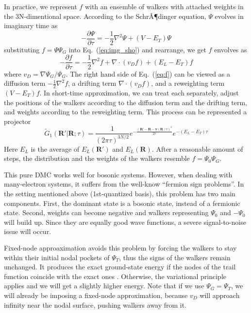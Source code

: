 \documentclass[aps,prl,reprint,groupedaddress]{revtex4-1}
\begin{document}
In practice, we represent $f$ with an ensemble of walkers with attached weights in the 3N-dimentional space.
According to the SchrÃ¶dinger equation, $\Psi$ evolves in imaginary time as
\begin{equation}
\label{eq:img_sho}
-\frac{\partial \Psi}{\partial \tau} = -\frac{1}{2}\nabla^2\Psi+(V-E_T)\Psi
\end{equation}
%
substituting $f=\Psi\Psi_G$ into Eq.~(\ref{eq:img_sho}) and rearrange, we get $f$ envolves as
\begin{equation}
\label{eq:f}
-\frac{\partial f}{\partial \tau} = -\frac{1}{2}\nabla^2f+\nabla\cdot(v_Df)+(E_L-E_T)f
\end{equation}
where $v_D = \nabla\Psi_G/\Psi_G$.
The right hand side of Eq.~(\ref{eq:f}) can be viewed as a diffusion term $-\frac{1}{2}\nabla^2f$, a drifting term $\nabla\cdot(v_Df)$, and a reweighting term $(V-E_T)f$.
In short-time approximation, we can treat each separately, adjust the positions of the walkers according to the diffusion term and the drifting term, and weights according to the reweighting term.
This process can be represented a projector
\begin{equation}
\label{eq:G1t}
\widetilde{G}_1(\bm{R'}|\bm{R};\tau)
= \frac{1}{(2\pi\tau)^{3N/2}} e^{-\frac{(\bm{R'}-\bm{R}-\bm{v}(\bm{R})\tau)^2}{2\tau}} e^{-\left(E_L-E_T\right)\tau}
\end{equation}
Here $E_L$ is the average of $E_L(\bm{R'})$ and $E_L(\bm{R})$.
After a reasonable amount of steps, the distribution and the weights of the walkers resemble $f=\Psi_0\Psi_G$.

This pure DMC works well for bosonic systems.
However, when dealing with many-electron systems, it suffers from the well-know ``fermion sign problems''.
In the setting mentioned above (1st-quantized basis), this problem has two main components.
First, the dominant state is a bosonic state, instead of a fermionic state.
Second, weights can become negative and walkers representing $\Psi_0$ and $-\Psi_0$ will build up. Since they are equally good wave functions, a severe signal-to-noise issue will occur.

Fixed-node approaximation avoids this problem by forcing the walkers to stay within their initial nodal pockets of $\Psi_T$, thus the signs of the walkers remain unchanged.
It produces the exact ground-state energy if the nodes of the trail function coincide with the exact ones \cite{reynolds1982fixed}.
Otherwise, the variational principle applies and we will get a slightly higher energy.
Note that if we use $\Psi_G = \Psi_T$, we will already be imposing a fixed-node approximation, because $v_D$ will approach infinity near the nodal surface, pushing walkers away from it.
\end{document}
